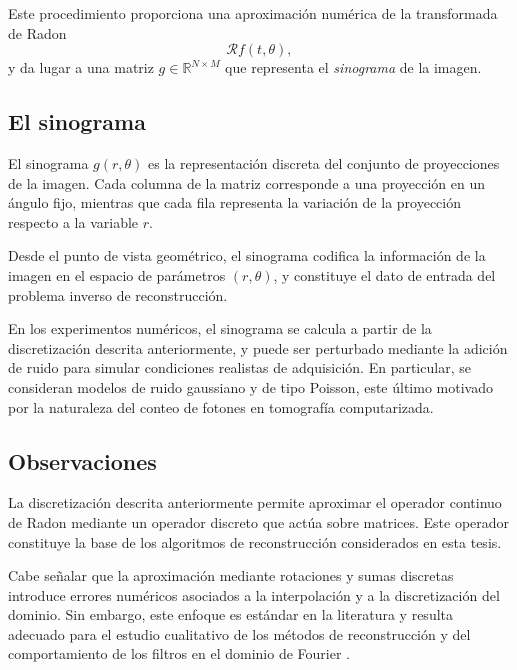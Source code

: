 Este procedimiento proporciona una aproximación numérica de la transformada de Radon
\[
\mathcal{R}f(t,\theta),
\]
y da lugar a una matriz $g \in \mathbb{R}^{N \times M}$ que representa el \emph{sinograma} de la imagen.

\subsection*{El sinograma}

El sinograma $g(r,\theta)$ es la representación discreta del conjunto de proyecciones de la imagen. Cada columna de la matriz corresponde a una proyección en un ángulo fijo, mientras que cada fila representa la variación de la proyección respecto a la variable $r$.

Desde el punto de vista geométrico, el sinograma codifica la información de la imagen en el espacio de parámetros $(r,\theta)$, y constituye el dato de entrada del problema inverso de reconstrucción.

En los experimentos numéricos, el sinograma se calcula a partir de la discretización descrita anteriormente, y puede ser perturbado mediante la adición de ruido para simular condiciones realistas de adquisición. En particular, se consideran modelos de ruido gaussiano y de tipo Poisson, este último motivado por la naturaleza del conteo de fotones en tomografía computarizada.

\subsection*{Observaciones}

La discretización descrita anteriormente permite aproximar el operador continuo de Radon mediante un operador discreto que actúa sobre matrices. Este operador constituye la base de los algoritmos de reconstrucción considerados en esta tesis.

Cabe señalar que la aproximación mediante rotaciones y sumas discretas introduce errores numéricos asociados a la interpolación y a la discretización del dominio. Sin embargo, este enfoque es estándar en la literatura y resulta adecuado para el estudio cualitativo de los métodos de reconstrucción y del comportamiento de los filtros en el dominio de Fourier \cite{kak_slaney1988,natterer2001}.